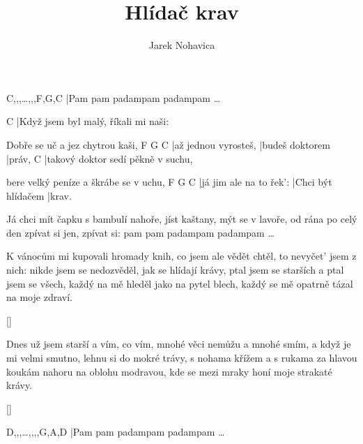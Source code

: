 \documentclass{song}
\title{Hlídač krav}
\author{Jarek Nohavica}
\begin{document}
\strophe
C,,,\ldots,,,F,G,C
|Pam pam padampam padampam \ldots
\endstrophe

\strophe
C
|Když jsem byl malý, říkali mi naši:

Dobře se uč a jez chytrou kaši,
F                    G               C
|až jednou vyrosteš, |budeš doktorem |práv,
C
|takový doktor sedí pěkně v suchu,

bere velký peníze a škrábe se v uchu,
F                       G                  C
|já jim ale na to řek': |Chci být hlídačem |krav.
\endstrophe

Já chci mít čapku s bambulí nahoře,
jíst kaštany, mýt se v lavoře,
od rána po celý den zpívat si jen,
zpívat si: pam pam padampam padampam \ldots
\endstrophe

\strophe*
K vánocům mi kupovali hromady knih,
co jsem ale vědět chtěl, to nevyčet' jsem z nich:
nikde jsem se nedozvěděl, jak se hlídají krávy,
ptal jsem se starších a ptal jsem se všech,
každý na mě hleděl jako na pytel blech,
každý se mě opatrně tázal na moje zdraví.
\endstrophe

\ref{}

\strophe*
Dnes už jsem starší a vím, co vím,
mnohé věci nemůžu a mnohé smím,
a když je mi velmi smutno, lehnu si do mokré trávy,
s nohama křížem a s rukama za hlavou
koukám nahoru na oblohu modravou,
kde se mezi mraky honí moje strakaté krávy.
\endstrophe

\ref{}

\strophe
D,,,\ldots,,,,G,A,D
|Pam pam padampam padampam \ldots
\endstrophe
\end{document}
